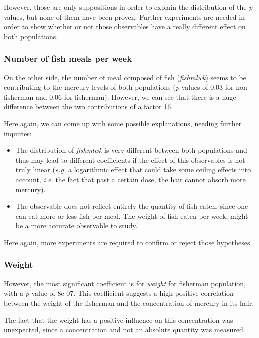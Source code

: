 \documentclass[12pt,]{article}
\begin{document}
However, those are only suppositions in order to explain the
distribution of the \emph{p}-values, but none of them have been proven.
Further experiments are needed in order to show whether or not those
observables have a really different effect on both populations.

\subsubsection{Number of fish meals per
week}\label{number-of-fish-meals-per-week}

On the other side, the number of meal composed of fish (\emph{fishmlwk})
seems to be contributing to the mercury levels of both populations
(\emph{p}-values of 0.03 for non-fisherman and 0.06 for fisherman).
However, we can see that there is a huge difference between the two
contributions of a factor 16.

Here again, we can come up with some possible explanations, needing
further inquiries:

\begin{itemize}
\item
  The distribution of \emph{fishmlwk} is very different between both
  populations and thus may lead to different coefficients if the effect
  of this observables is not truly linear (\emph{e.g.} a logarithmic
  effect that could take some ceiling effects into account, \emph{i.e.}
  the fact that past a certain dose, the hair cannot absorb more
  mercury).
\item
  The observable does not reflect entirely the quantity of fish eaten,
  since one can eat more or less fish per meal. The weight of fish eaten
  per week, might be a more accurate observable to study.
\end{itemize}

Here again, more experiments are required to confirm or reject those
hypotheses.

\subsubsection{Weight}\label{weight}

However, the most significant coefficient is for \emph{weight} for
fisherman population, with a \emph{p}-value of 8e-07. This coefficient
suggests a high positive correlation between the weight of the fisherman
and the concentration of mercury in its hair.

The fact that the weight has a positive influence on this concentration
was unexpected, since a concentration and not an absolute quantity was
measured.
\end{document}
